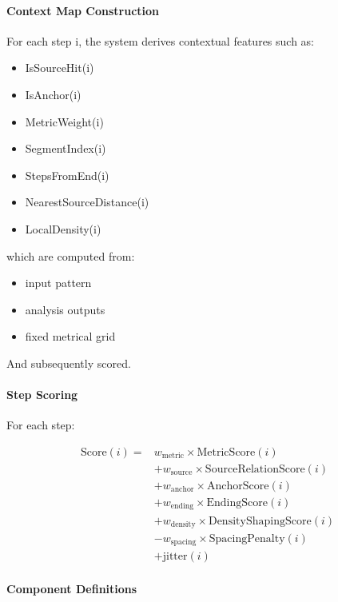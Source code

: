 \paragraph{Context Map Construction}\label{context-map-construction}

For each step i, the system derives contextual features such as:

\begin{itemize}
\item
  IsSourceHit(i)
\item
  IsAnchor(i)
\item
  MetricWeight(i)
\item
  SegmentIndex(i)
\item
  StepsFromEnd(i)
\item
  NearestSourceDistance(i)
\item
  LocalDensity(i)
\end{itemize}

which are computed from:

\begin{itemize}
\item
  input pattern
\item
  analysis outputs
\item
  fixed metrical grid
\end{itemize}

And subsequently scored.

\paragraph{Step Scoring}\label{step-scoring}

For each step:

\[
\begin{aligned}
\mathrm{Score}(i) ={}& w_{\mathrm{metric}} \times \mathrm{MetricScore}(i) \\
&+ w_{\mathrm{source}} \times \mathrm{SourceRelationScore}(i) \\
&+ w_{\mathrm{anchor}} \times \mathrm{AnchorScore}(i) \\
&+ w_{\mathrm{ending}} \times \mathrm{EndingScore}(i) \\
&+ w_{\mathrm{density}} \times \mathrm{DensityShapingScore}(i) \\
&- w_{\mathrm{spacing}} \times \mathrm{SpacingPenalty}(i) \\
&+ \mathrm{jitter}(i)
\end{aligned}
\]

\paragraph{Component Definitions}\label{component-definitions}

